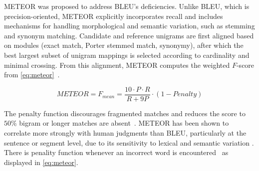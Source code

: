 METEOR was proposed to address BLEU’s deficiencies. 
Unlike BLEU, which is precision-oriented, METEOR explicitly incorporates recall and includes mechanisms for handling morphological and semantic variation, such as stemming and synonym matching. 
Candidate and reference unigrams are first aligned based on modules (exact match, Porter stemmed match, synonymy), after which the best largest subset of unigram mappings is selected according to cardinality and minimal crossing. 
From this alignment, METEOR computes the weighted $F$-score from \autoref{eq:meteor}~\citep{banerjee_METEOR_2005}.

\begin{equation}
    METEOR = F_{mean} = \frac{10 \cdot P \cdot R}{R + 9P} \cdot (1 - Penalty)
\label{eq:meteor}
\end{equation}

The penalty function discourages fragmented matches and reduces the score to $50\%$ bigram or longer matches are absent~\citep{banerjee_METEOR_2005}. 
METEOR has been shown to correlate more strongly with human judgments than BLEU, particularly at the sentence or segment level, due to its sensitivity to lexical and semantic variation \citep{zhou_paraphrase_2021,kurt_pehlivanoglu_comparative_2024}.
There is penality function whenever an incorrect word is encountered~\citep{palivela_optimization_2021} as displayed in \autoref{eq:meteor}.



